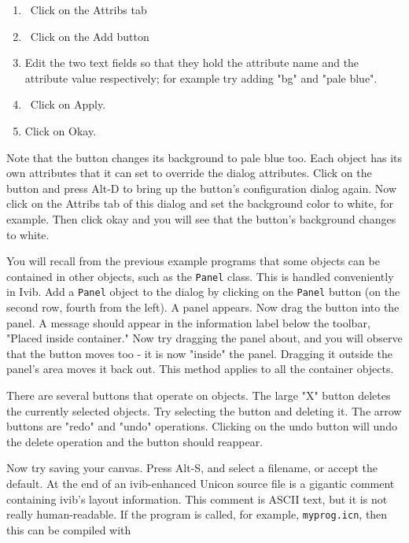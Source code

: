 \begin{enumerate}
\item \ Click on the Attribs tab

\item \ Click on the Add button


\item Edit the two text fields so that they hold the attribute name and
the attribute value respectively; for example try adding
"bg" and "pale blue".
\item \ Click on Apply.

\item Click on Okay.
\end{enumerate}

\bigskip

Note that the button changes its background to pale blue too. Each
object has its own attributes that it can set to override the dialog
attributes. Click on the button and press Alt-D to bring up the
button's configuration dialog again. Now click on the
Attribs tab of this dialog and set the background color to white, for
example. Then click okay and you will see that the
button's background changes to white.

You will recall from the previous example programs that some objects can
be contained in other objects, such as the \texttt{Panel} class. This
is handled conveniently in Ivib. Add a \texttt{Panel} object to the
dialog by clicking on the \texttt{Panel} button (on the second row,
fourth from the left). A panel appears. Now drag the button into the
panel. A message should appear in the information label below the
toolbar, "Placed inside container." Now try
dragging the panel about, and you will observe that the button moves
too - it is now "inside" the panel.
Dragging it outside the panel's area moves it back
out. This method applies to all the container objects.

There are several buttons that operate on objects. The large
"X" button deletes the currently selected
objects. Try selecting the button and deleting it. The arrow buttons
are "redo" and
"undo" operations. Clicking on the undo
button will undo the delete operation and the button should reappear.

Now try saving your canvas. Press Alt-S, and select a filename, or
accept the default. At the end of an ivib-enhanced Unicon source file
is a gigantic comment containing ivib's layout
information. This comment is ASCII text, but it is not
really human-readable. If the program is called, for example,
\texttt{myprog.icn}, then this can be compiled with

